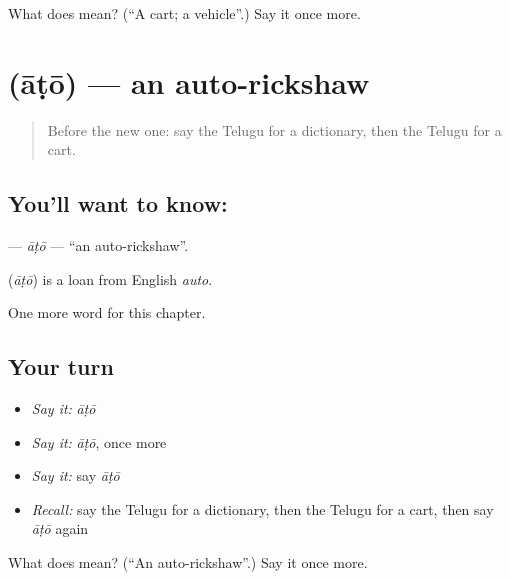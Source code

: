 \begin{tcolorbox}[breakable,colback=teal!4,colframe=teal!35!black,title={Before you move on}]
What does  mean? (\textquotedblleft{}A cart; a vehicle\textquotedblright{}.) Say it once more.
\end{tcolorbox}
\section[\texorpdfstring{\te{ఆటో} (āṭō)}{ఆటో (āṭō)}]{ (āṭō) — an auto-rickshaw}

\label{lesson:TE-C301-ato}



\begin{quote}
Before the new one: say the Telugu for a dictionary, then the Telugu for a cart.
\end{quote}

\subsection*{You'll want to know: }
\textbf{} — \emph{āṭō} — \textquotedblleft{}an auto-rickshaw\textquotedblright{}.

\begin{cousinweb}
\textbf{} (\emph{āṭō}) is a loan from English \emph{auto}.
\end{cousinweb}

\begin{grammarlens}[title={What you've built}]
One more word for this chapter.
\end{grammarlens}

\subsection*{Your turn}
\begin{itemize}
\raggedright
  \item \emph{Say it:} \emph{āṭō}
  \item \emph{Say it:} \emph{āṭō}, once more
  \item \emph{Say it:} say \emph{āṭō}
  \item \emph{Recall:} say the Telugu for a dictionary, then the Telugu for a cart, then say \emph{āṭō} again
\end{itemize}

\begin{tcolorbox}[breakable,colback=teal!4,colframe=teal!35!black,title={Before you move on}]
What does  mean? (\textquotedblleft{}An auto-rickshaw\textquotedblright{}.) Say it once more.
\end{tcolorbox}
